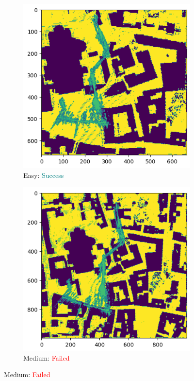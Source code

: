 \documentclass[11pt]{article}
\begin{document}
    \newpage
    \begin{figure}[p]
        \centering
        \begin{subfigure}{0.45\textwidth}
            \centering
            \includegraphics[width=\linewidth]{images/full/easy/5_2_4_easy}
            \caption{Easy: \textcolor{teal}{Success}}
            \label{fig:5_2_4_easy}
        \end{subfigure}
        \hfill
        \begin{subfigure}{0.45\textwidth}
            \centering
            \includegraphics[width=\linewidth]{images/full/medium/5_2_4_medium}
            \caption{Medium: \textcolor{red}{Failed}}
            \label{fig:5_2_4_medium}
        \end{subfigure}


\end{figure}
\end{document}
